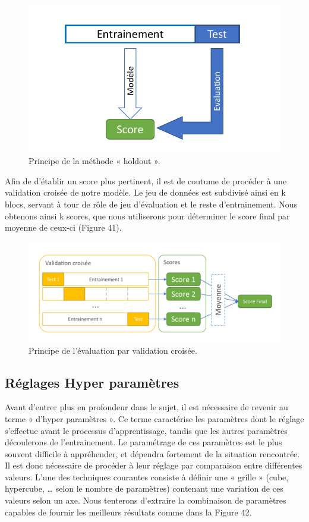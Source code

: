 \begin{figure}[H]
    \centering
    \includegraphics[width=\linewidth]{contents/chapter_3/resources/holdout.pdf}
    \caption{Principe de la méthode « holdout ».}
    \label{fig:holdout}
\end{figure}

Afin de d’établir un score plus pertinent, il est de coutume de procéder à une validation croisée de notre modèle. Le jeu de données est subdivisé ainsi en k blocs, servant à tour de rôle de jeu d’évaluation et le reste d’entrainement. Nous obtenons ainsi k scores, que nous utiliserons pour déterminer le score final par moyenne de ceux-ci (Figure 41).
 
 \begin{figure}[H]
    \centering
    \includegraphics[width=\linewidth]{contents/chapter_3/resources/cross_validation.pdf}
    \caption{Principe de l’évaluation par validation croisée.}
    \label{fig:cross_validation}
\end{figure}

\subsection{Réglages Hyper paramètres}
Avant d’entrer plus en profondeur dans le sujet, il est nécessaire de revenir au terme « d’hyper paramètres ». Ce terme caractérise les paramètres dont le réglage s’effectue avant le processus d’apprentissage, tandis que les autres paramètres découlerons de l’entrainement.
Le paramétrage de ces paramètres est le plus souvent difficile à appréhender, et dépendra fortement de la situation rencontrée. Il est donc nécessaire de procéder à leur réglage par comparaison entre différentes valeurs. L’une des techniques courantes consiste à définir une « grille » (cube, hypercube, … selon le nombre de paramètres) contenant une variation de ces valeurs selon un axe. Nous tenterons d’extraire la combinaison de paramètres capables de fournir les meilleurs résultats comme dans la Figure 42.

